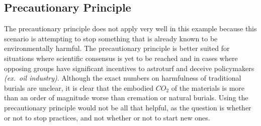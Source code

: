 \documentclass[a4paper,12pt]{article}
\begin{document}
\subsection{Precautionary Principle}
The precautionary principle does not apply very well in this example because this scenario is attempting to stop something that is already known to be environmentally harmful.
The precautionary principle is better suited for situations where scientific consensus is yet to be reached and in cases where opposing groups have significant incentives to astroturf and deceive policymakers \textit{(ex.\ oil industry)}.
Although the exact numbers on harmfulness of traditional burials are unclear, it is clear that the embodied $CO_2$ of the materials is more than an order of magnitude worse than cremation or natural burials.
Using the precautionary principle would not be all that helpful, as the question is whether or not to stop practices, and not whether or not to start new ones.



\end{document}
